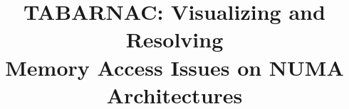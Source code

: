 \documentclass{sig-alternate}
\begin{document}
\title{TABARNAC: Visualizing and Resolving\\ Memory Access Issues on NUMA Architectures}

%
%
%
%
\end{document}
